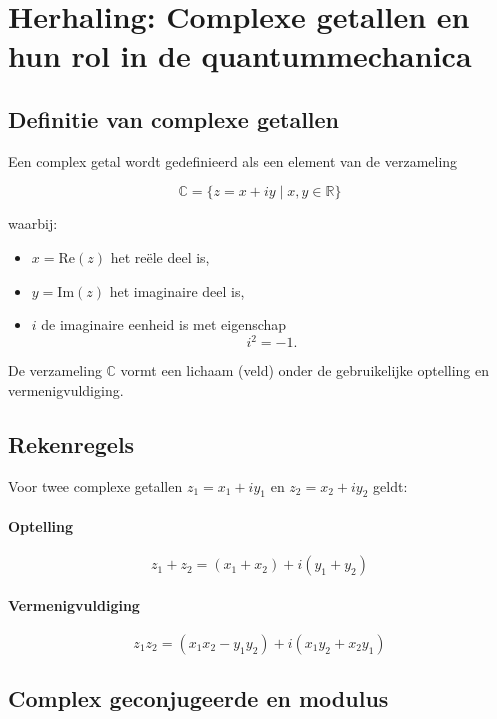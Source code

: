 \documentclass{report} %
\begin{document}
    \section{Herhaling: Complexe getallen en hun rol in de quantummechanica}

    \subsection{Definitie van complexe getallen}

    Een complex getal wordt gedefinieerd als een element van de verzameling

    \[
        \mathbb{C} = \{ z = x + iy \mid x,y \in \mathbb{R} \}
    \]

    waarbij:
    \begin{itemize}
        \item $x = \mathrm{Re}(z)$ het reële deel is,
        \item $y = \mathrm{Im}(z)$ het imaginaire deel is,
        \item $i$ de imaginaire eenheid is met eigenschap
        \[
            i^2 = -1.
        \]
    \end{itemize}

    De verzameling $\mathbb{C}$ vormt een lichaam (veld) onder de gebruikelijke optelling en vermenigvuldiging.

    \subsection{Rekenregels}

    Voor twee complexe getallen $z_1 = x_1 + iy_1$ en $z_2 = x_2 + iy_2$ geldt:

    \paragraph{Optelling}
    \[
        z_1 + z_2 = (x_1 + x_2) + i(y_1 + y_2)
    \]

    \paragraph{Vermenigvuldiging}
    \[
        z_1 z_2 = (x_1x_2 - y_1y_2) + i(x_1y_2 + x_2y_1)
    \]

    \subsection{Complex geconjugeerde en modulus}
\end{document}
